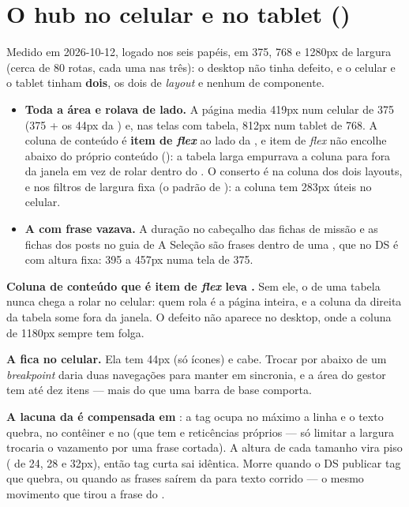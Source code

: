 \section{O hub no celular e no tablet ()}
\label{ds:responsivo}

Medido em 2026-10-12, logado nos seis papéis, em 375, 768 e 1280px de largura
(cerca de 80 rotas, cada uma nas três): o desktop não tinha defeito, e o
celular e o tablet tinham \textbf{dois}, os dois de \emph{layout} e nenhum de
componente.

\begin{itemize}
  \item \textbf{Toda a área  e  rolava de lado.} A
    página media 419px num celular de 375 (375 + os 44px da ) e,
    nas telas com tabela, 812px num tablet de 768. A coluna de conteúdo é
    \textbf{item de \emph{flex}} ao lado da , e item de \emph{flex}
    não encolhe abaixo do próprio conteúdo (): a tabela
    larga empurrava a coluna para fora da janela em vez de rolar dentro do
    . O conserto é  na coluna dos dois layouts, e
     nos filtros de largura fixa (o padrão de
    ): a coluna tem 283px úteis no celular.
  \item \textbf{A  com frase vazava.} A duração no cabeçalho das fichas
    de missão e as fichas dos posts no guia de A Seleção são frases dentro de
    uma , que no DS é  com altura fixa: 395 a 457px numa
    tela de 375.
\end{itemize}

\begin{atencao}
\textbf{Coluna de conteúdo que é item de \emph{flex} leva .} Sem ele,
o  de uma tabela nunca chega a rolar no celular: quem rola é a
página inteira, e a coluna da direita da tabela some fora da janela. O
defeito não aparece no desktop, onde a coluna de 1180px sempre tem folga.
\end{atencao}

\textbf{A  fica no celular.} Ela tem 44px (só ícones) e cabe. Trocar
por  abaixo de um \emph{breakpoint} daria duas navegações para
manter em sincronia, e a área do gestor tem até dez itens --- mais do que uma
barra de base comporta.

\textbf{A lacuna da  é compensada em }: a tag ocupa no
máximo a linha e o texto quebra, no contêiner e no  (que tem
 e reticências próprios --- só limitar a largura trocaria o
vazamento por uma frase cortada). A altura de cada tamanho vira piso
( de 24, 28 e 32px), então tag curta sai idêntica. Morre quando o
DS publicar tag que quebra, ou quando as frases saírem da  para texto
corrido --- o mesmo movimento que tirou a frase do .

